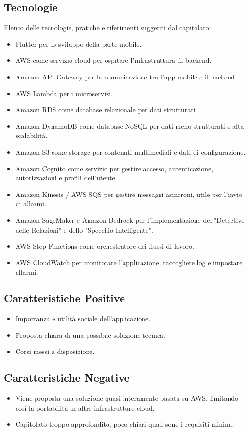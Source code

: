\documentclass[a4paper,12pt]{article}
\begin{document}
    \subsection{Tecnologie}
    Elenco delle tecnologie, pratiche e riferimenti suggeriti dal capitolato:
    \begin{itemize}
        \item Flutter per lo sviluppo della parte mobile.
        \item AWS come servizio cloud per ospitare l’infrastruttura di backend.
        \item Amazon API Gateway per la comunicazione tra l’app mobile e il backend.
        \item AWS Lambda per i microservizi.
        \item Amazon RDS come database relazionale per dati strutturati.
        \item Amazon DynamoDB come database NoSQL per dati meno strutturati e alta scalabilità.
        \item Amazon S3 come storage per contenuti multimediali e dati di configurazione.
        \item Amazon Cognito come servizio per gestire accesso, autenticazione, autorizzazioni e profili dell’utente.
        \item Amazon Kinesis / AWS SQS per gestire messaggi asincroni, utile per l’invio di allarmi.
        \item Amazon SageMaker e Amazon Bedrock  per l'implementazione del "Detective delle Relazioni" e dello "Specchio Intelligente".
        \item AWS Step Functions come orchestratore dei flussi di lavoro.
        \item AWS CloudWatch per monitorare l’applicazione, raccogliere log e impostare allarmi.
    \end{itemize}
    \subsection{Caratteristiche Positive}
    \begin{itemize}
        \item Importanza e utilità sociale dell’applicazione.
        \item Proposta chiara di una possibile soluzione tecnica.
        \item Corsi messi a disposizione.
    \end{itemize}
    \subsection{Caratteristiche Negative}
    \begin{itemize}
        \item Viene proposta una soluzione quasi interamente basata su AWS, limitando così la portabilità in altre infrastrutture cloud.
        \item Capitolato troppo approfondito, poco chiari quali sono i requisiti minimi.
    \end{itemize}
\end{document}
